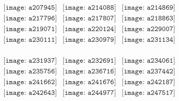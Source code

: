 \documentclass{article}
\begin{document}
        \clearpage
        \begin{figure}[H]
 \begin{center}$
 \begin{array}{cccc}
\texttt{[image: a207945]}&\texttt{[image: a214088]}&\texttt{[image: a214869]}\\\texttt{[image: a217796]}&\texttt{[image: a217807]}&\texttt{[image: a218863]}\\\texttt{[image: a219071]}&\texttt{[image: a220124]}&\texttt{[image: a229007]}\\\texttt{[image: a230111]}&\texttt{[image: a230979]}&\texttt{[image: a231134]}\\
\end{array}$
\end{center}
\end{figure}

\begin{figure}[H]
 \begin{center}$
 \begin{array}{cccc}
\texttt{[image: a231937]}&\texttt{[image: a232691]}&\texttt{[image: a234061]}\\\texttt{[image: a235756]}&\texttt{[image: a236716]}&\texttt{[image: a237442]}\\\texttt{[image: a241662]}&\texttt{[image: a241676]}&\texttt{[image: a242187]}\\\texttt{[image: a242643]}&\texttt{[image: a244977]}&\texttt{[image: a247517]}\\
\end{array}$
\end{center}
\end{figure}
\end{document}
